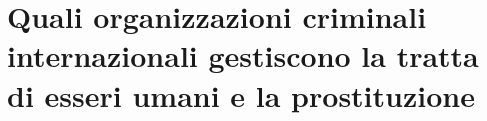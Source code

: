 \section{Quali organizzazioni criminali internazionali gestiscono la tratta di esseri umani e la prostituzione}